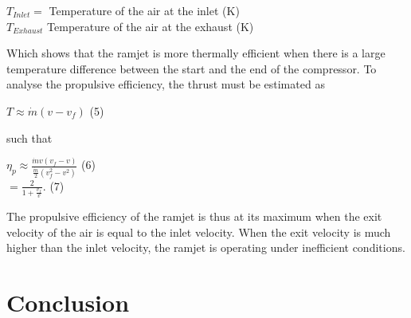 \documentclass[12pt,onecolumn]{IEEEtran}
\begin{document}
\begin{flushleft}
\begin{center}
\vspace{1mm}
$T_{Inlet} = $ Temperature of the air at the inlet (K)\\
\vspace{1mm}
$T_{Exhaust} $ Temperature of the air at the exhaust (K)\\
\end{center}
Which shows that the ramjet is more thermally efficient when there is a large temperature difference between the start and the end of the compressor.
\vspace{3mm}
To analyse the propulsive efficiency, the thrust must be estimated as\\
\begin{center}
$T\approx\dot{m}(v-v_f)$ (5)
\end{center}
\vspace{1mm}
such that\\
\begin{center}
$\eta_p\approx\frac{\dot{m}v(v_f-v)}{\frac{\dot{m}}{2}(v_f^2-v^2)}$ (6)\\
\vspace{1mm}
$=\frac{2}{1+\frac{v_f}{v}}$. (7)
\end{center}
The propulsive efficiency of the ramjet is thus at its maximum when the exit velocity of the air is equal to the inlet velocity. When the exit velocity is much higher than the inlet velocity, the ramjet is operating under inefficient conditions.
\end{flushleft}
\section{Conclusion}



\end{document}
